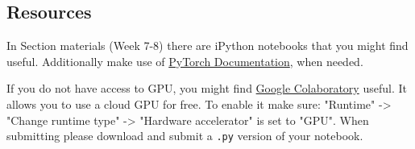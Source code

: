 \documentclass{article}
\begin{document}
    \subsection*{Resources}
        In Section materials (Week 7-8) there are iPython notebooks that you might find useful.
        Additionally make use of \href{https://pytorch.org/docs/stable/index.html}{PyTorch Documentation}, when needed.
        
        If you do not have access to GPU, you might find \href{https://colab.research.google.com/}{Google Colaboratory} useful.
        It allows you to use a cloud GPU for free.
        To enable it make sure: "Runtime" -> "Change runtime type" -> "Hardware accelerator" is set to "GPU". When submitting please download and submit a \texttt{.py} version of your notebook.
\end{document}
